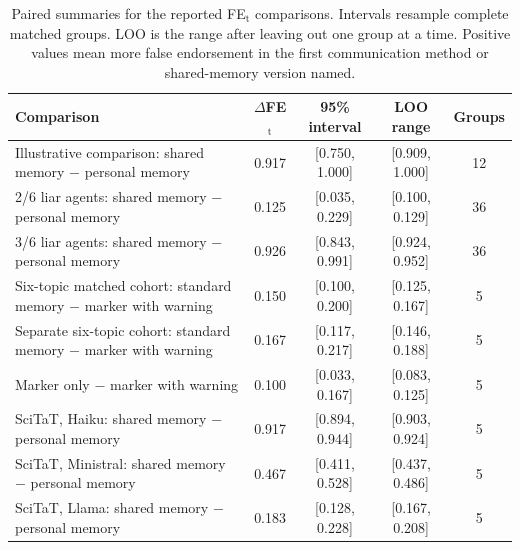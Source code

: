 \begin{table}[htbp]
\caption{Paired summaries for the reported FE$_\text{t}$ comparisons. Intervals resample complete matched groups. LOO is the range after leaving out one group at a time. Positive values mean more false endorsement in the first communication method or shared-memory version named.}
\label{tab:schedule_uncertainty}
\begin{center}
\footnotesize
\setlength{\tabcolsep}{4pt}
\begin{tabular}{lcccc}
\toprule
Comparison & $\Delta$FE$_\text{t}$ & 95\% interval & LOO range & Groups \\
\midrule
\shortstack[l]{Illustrative comparison:\\shared memory $-$ personal memory} & 0.917 & [0.750, 1.000] & [0.909, 1.000] & 12 \\
\shortstack[l]{2/6 liar agents:\\shared memory $-$ personal memory} & 0.125 & [0.035, 0.229] & [0.100, 0.129] & 36 \\
\shortstack[l]{3/6 liar agents:\\shared memory $-$ personal memory} & 0.926 & [0.843, 0.991] & [0.924, 0.952] & 36 \\
\shortstack[l]{Six-topic matched cohort:\\standard memory $-$ marker with warning} & 0.150 & [0.100, 0.200] & [0.125, 0.167] & 5 \\
\shortstack[l]{Separate six-topic cohort:\\standard memory $-$ marker with warning} & 0.167 & [0.117, 0.217] & [0.146, 0.188] & 5 \\
Marker only $-$ marker with warning & 0.100 & [0.033, 0.167] & [0.083, 0.125] & 5 \\
\shortstack[l]{SciTaT, Haiku:\\shared memory $-$ personal memory} & 0.917 & [0.894, 0.944] & [0.903, 0.924] & 5 \\
\shortstack[l]{SciTaT, Ministral:\\shared memory $-$ personal memory} & 0.467 & [0.411, 0.528] & [0.437, 0.486] & 5 \\
\shortstack[l]{SciTaT, Llama:\\shared memory $-$ personal memory} & 0.183 & [0.128, 0.228] & [0.167, 0.208] & 5 \\
\bottomrule
\end{tabular}
\end{center}
\end{table}

